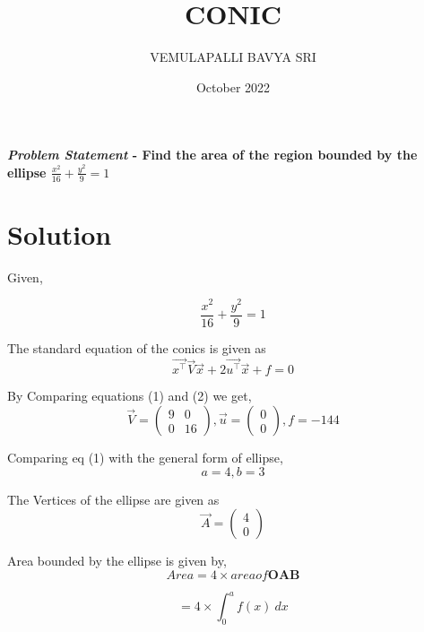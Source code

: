\documentclass[journal,10pt,twocolumn]{article}
\title{\textbf{CONIC}}
\author{VEMULAPALLI BAVYA SRI}
\date{October 2022}
\newcommand{\myvec}[1]{\ensuremath{\begin{pmatrix}#1\end{pmatrix}}}
\begin{document}
\maketitle
\paragraph{\textit{Problem Statement} - Find the area of the region bounded by the ellipse 
$\frac{x^2}{16} + \frac{y^2}{9} = 1$}
  
\section{Solution}

    Given, 
    
    \begin{equation}
        \frac{x^2}{16} + \frac{y^2}{9} = 1
    \end{equation}
    
    The standard equation of the conics is given as
    \begin{equation}
        \Vec{x^\top}\Vec{V}\Vec{x} + 2\Vec{u^\top}\Vec{x} + f = 0
    \end{equation}
    
    By Comparing equations (1) and (2) we get,
    \begin{equation}
        \Vec{V} = \myvec{9 & 0 \\ 0 & 16} , \Vec{u} = \myvec{0 \\ 0} , f = -144
    \end{equation}
    
    Comparing eq (1) with the general form of ellipse,
    \begin{equation}
        a = 4 , b = 3
    \end{equation}
    
    The Vertices of the ellipse are given as
    \begin{equation}
        \Vec{A} = \myvec{4 \\ 0}
    \end{equation}
    
    Area bounded by the ellipse is given by,
    \begin{equation}
    Area = 4 \times area of \boldsymbol{OAB}
    \end{equation}
    
    \begin{equation}
        = 4 \times \int_{0}^{a} f(x) \ dx 
    \end{equation}
    
\end{document}
